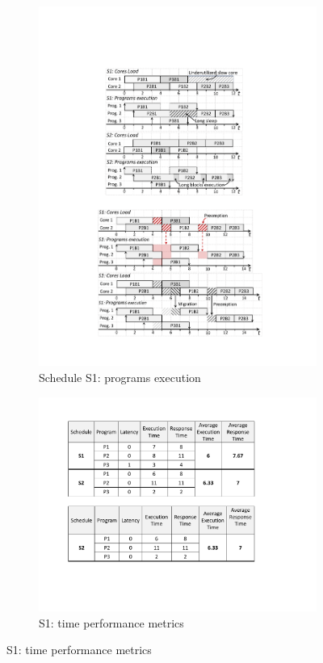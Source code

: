 \begin{figure}
\begin{minipage}{.7\columnwidth}%
\begin{subfigure}{\linewidth}
\includegraphics[width=\linewidth]{figs/s1.pdf}
\caption{Schedule S1: programs execution}
\vspace{3mm}
\label{fig:s1}
\end{subfigure}

\begin{subfigure}{\linewidth}
\centering
\includegraphics[width=\linewidth]{figs/s1Metrics.pdf}
\caption{S1: time performance metrics}
\vspace{1mm}
\label{fig:s1Metrics}
\end{subfigure}
\end{minipage}


\end{figure}
